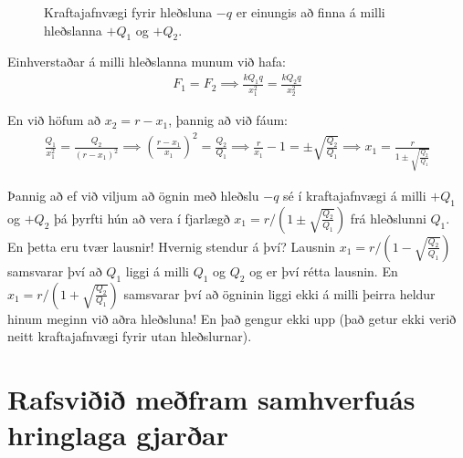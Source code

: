 \ifdefined \wholebook \else\documentclass[oneside]{book}\usepackage{EdlBook}\graphicspath{{figures/}}
\begin{document}
\begin{figure}[H]
    \centering
{}
    \caption{Kraftajafnvægi fyrir hleðsluna $-q$ er einungis að finna á milli hleðslanna $+Q_1$ og $+Q_2$.}
\end{figure}

Einhverstaðar á milli hleðslanna munum við hafa:
\begin{align*}
    F_1 = F_2 \implies \frac{kQ_1 q}{x_1^2} = \frac{kQ_2 q}{x_2^2}
\end{align*}

En við höfum að $x_2 = r - x_1$, þannig að við fáum:
\begin{align*}
    \frac{Q_1}{x_1^2} = \frac{Q_2}{(r-x_1)^2} \implies \left( \frac{r-x_1}{x_1} \right)^2 = \frac{Q_2}{Q_1} \implies \frac{r}{x_1} - 1 = \pm \sqrt{\frac{Q_2}{Q_1}} \implies x_1 = \frac{r}{1 \pm \sqrt{\frac{Q_2}{Q_1}}}
\end{align*}

Þannig að ef við viljum að ögnin með hleðslu $-q$ sé í kraftajafnvægi á milli $+Q_1$ og $+Q_2$ þá þyrfti hún að vera í fjarlægð $x_1 = r/\left(1 \pm \sqrt{\frac{Q_2}{Q_1}}\right)$ frá hleðslunni $Q_1$. En þetta eru tvær lausnir! Hvernig stendur á því? Lausnin $x_1 = r/\left(1- \sqrt{\frac{Q_2}{Q_1}}\right)$ samsvarar því að $Q_1$ liggi á milli $Q_1$ og $Q_2$ og er því rétta lausnin. En $x_1 = r/\left(1 + \sqrt{\frac{Q_2}{Q_1}}\right)$ samsvarar því að ögninin liggi ekki á milli þeirra heldur hinum meginn við aðra hleðsluna! En það gengur ekki upp (það getur ekki verið neitt kraftajafnvægi fyrir utan hleðslurnar).



\section{Rafsviðið meðfram samhverfuás hringlaga gjarðar}
\end{document}
